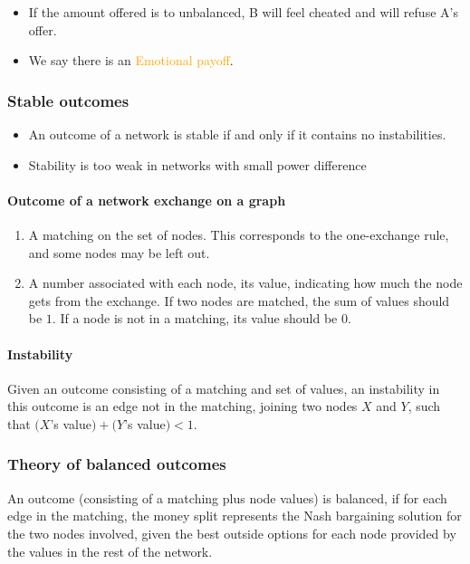 \begin{itemize}
\item If the amount offered is to unbalanced, B will feel cheated and will refuse A's offer.
\item We say there is an \textcolor{orange}{Emotional payoff}.
\end{itemize}

\subsubsection{Stable outcomes}

\begin{itemize}
\item An outcome of a network is stable if and only if it contains no instabilities.
\item Stability is too weak in networks with small power difference
\end{itemize}

\paragraph{Outcome of a network exchange on a graph}

\begin{enumerate}
\item A matching on the set of nodes. This corresponds to the one-exchange rule, and some nodes may be left out.
\item A number associated with each node, its value, indicating how much the node gets from the exchange. If two nodes are matched, the sum of values should be $1$. If a node is not in a matching, its value should be $0$.
\end{enumerate}

\paragraph{Instability}

Given an outcome consisting of a matching and set of values, an instability in this outcome is an edge not in the matching, joining two nodes $X$ and $Y$, such that $(X$’s value$) + (Y$’s value$) < 1$.

\subsubsection{Theory of balanced outcomes}

\begin{formal}
An outcome (consisting of a matching plus node values) is balanced, if for each edge in the matching, the money split represents the Nash bargaining solution for the two nodes involved, given the best outside options for each node provided by the values in the rest of the network.
\end{formal}

